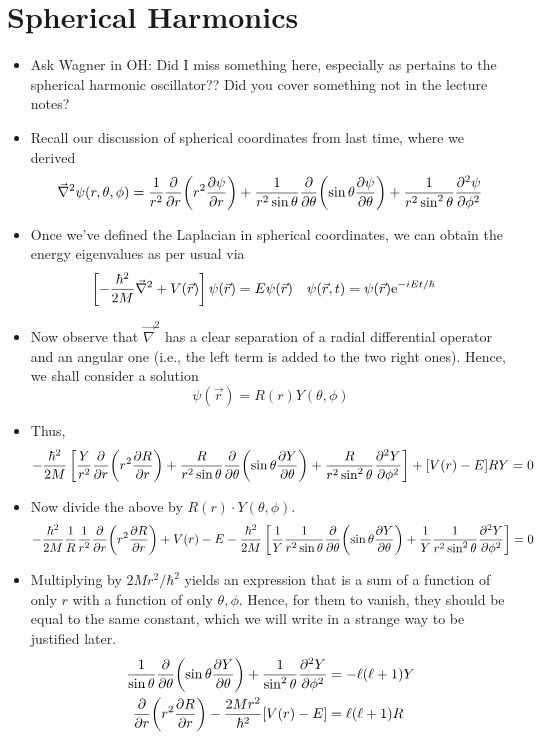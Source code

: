 \documentclass[../notes.tex]{subfiles}
\begin{document}
\section{Spherical Harmonics}
\begin{itemize}
    \item {}Ask Wagner in OH: Did I miss something here, especially as pertains to the spherical harmonic oscillator?? Did you cover something not in the lecture notes?
    \item Recall our discussion of spherical coordinates from last time, where we derived
    \begin{equation*}
        \vec{\nabla}^2\psi(r,\theta,\phi) = \frac{1}{r^2}\pdv{r}(r^2\pdv{\psi}{r})+\frac{1}{r^2\sin\theta}\pdv{\theta}(\sin\theta\pdv{\psi}{\theta})+\frac{1}{r^2\sin^2\theta}\pdv[2]{\psi}{\phi}
    \end{equation*}
    \item Once we've defined the Laplacian in spherical coordinates, we can obtain the energy eigenvalues as per usual via
    \begin{align*}
        \left[ -\frac{\hbar^2}{2M}\vec{\nabla}^2+V(\vec{r}) \right]\psi(\vec{r}) &= E\psi(\vec{r})&
        \psi(\vec{r},t) &= \psi(\vec{r})\e[-iEt/\hbar]
    \end{align*}
    \item Now observe that $\vec{\nabla}^2$ has a clear separation of a radial differential operator and an angular one (i.e., the left term is added to the two right ones). Hence, we shall consider a solution
    \begin{equation*}
        \psi(\vec{r}) = R(r)Y(\theta,\phi)
    \end{equation*}
    \item Thus,
    \begin{equation*}
        -\frac{\hbar^2}{2M}\left[ \frac{Y}{r^2}\pdv{r}(r^2\pdv{R}{r})+\frac{R}{r^2\sin\theta}\pdv{\theta}(\sin\theta\pdv{Y}{\theta})+\frac{R}{r^2\sin^2\theta}\pdv[2]{Y}{\phi} \right]+[V(r)-E]RY = 0
    \end{equation*}
    \item Now divide the above by $R(r)\cdot Y(\theta,\phi)$.
    \begin{equation*}
        -\frac{\hbar^2}{2M}\frac{1}{R}\frac{1}{r^2}\pdv{r}(r^2\pdv{R}{r})+V(r)-E-\frac{\hbar^2}{2M}\left[ \frac{1}{Y}\frac{1}{r^2\sin\theta}\pdv{\theta}(\sin\theta\pdv{Y}{\theta})+\frac{1}{Y}\frac{1}{r^2\sin^2\theta}\pdv[2]{Y}{\phi} \right] = 0
    \end{equation*}
    \item Multiplying by $2Mr^2/\hbar^2$ yields an expression that is a sum of a function of only $r$ with a function of only $\theta,\phi$. Hence, for them to vanish, they should be equal to the same constant, which we will write in a strange way to be justified later.
    \begin{align*}
        \frac{1}{\sin\theta}\pdv{\theta}(\sin\theta\pdv{Y}{\theta})+\frac{1}{\sin^2\theta}\pdv[2]{Y}{\phi} &= -\ell(\ell+1)Y\\
        \pdv{r}(r^2\pdv{R}{r})-\frac{2Mr^2}{\hbar^2}[V(r)-E] &= \ell(\ell+1)R
    \end{align*}
\end{itemize}
\end{document}
